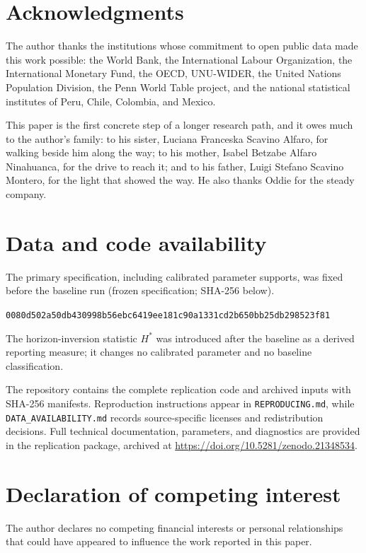 \section*{Acknowledgments}

The author thanks the institutions whose commitment to open public data made this work possible: the World Bank, the International Labour Organization, the International Monetary Fund, the OECD, UNU-WIDER, the United Nations Population Division, the Penn World Table project, and the national statistical institutes of Peru, Chile, Colombia, and Mexico.

This paper is the first concrete step of a longer research path, and it owes much to the author's family: to his sister, Luciana Franceska Scavino Alfaro, for walking beside him along the way; to his mother, Isabel Betzabe Alfaro Ninahuanca, for the drive to reach it; and to his father, Luigi Stefano Scavino Montero, for the light that showed the way. He also thanks Oddie for the steady company.

\section*{Data and code availability}

The primary specification, including calibrated parameter supports, was fixed before the baseline run (frozen specification; SHA-256 below).\par
\nolinkurl{0080d502a50db430998b56ebc6419ee181c90a1331cd2b650bb25db298523f81}

The horizon-inversion statistic $H^*$ was introduced after the baseline as a derived reporting measure; it changes no calibrated parameter and no baseline classification.

The repository contains the complete replication code and archived inputs with SHA-256 manifests. Reproduction instructions appear in \nolinkurl{REPRODUCING.md}, while \nolinkurl{DATA_AVAILABILITY.md} records source-specific licenses and redistribution decisions. Full technical documentation, parameters, and diagnostics are provided in the replication package, archived at \url{https://doi.org/10.5281/zenodo.21348534}.

\section*{Declaration of competing interest}

The author declares no competing financial interests or personal relationships that could have appeared to influence the work reported in this paper.

